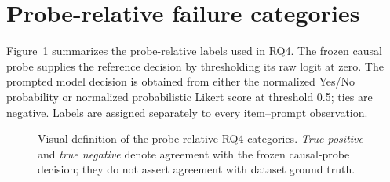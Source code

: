 \section{Probe-relative failure categories}
\label{app:failure-grid}

Figure~\ref{fig:failure-grid} summarizes the probe-relative labels used in RQ4. The frozen causal probe supplies the reference decision by thresholding its raw logit at zero. The prompted model decision is obtained from either the normalized Yes/No probability or normalized probabilistic Likert score at threshold 0.5; ties are negative. Labels are assigned separately to every item--prompt observation.

\begin{figure}[t]
\centering
\large
\renewcommand{\arraystretch}{2.2}
\setlength{\tabcolsep}{16pt}
\caption{Visual definition of the probe-relative RQ4 categories. \emph{True positive} and \emph{true negative} denote agreement with the frozen causal-probe decision; they do not assert agreement with dataset ground truth.}
\label{fig:failure-grid}
\end{figure}
